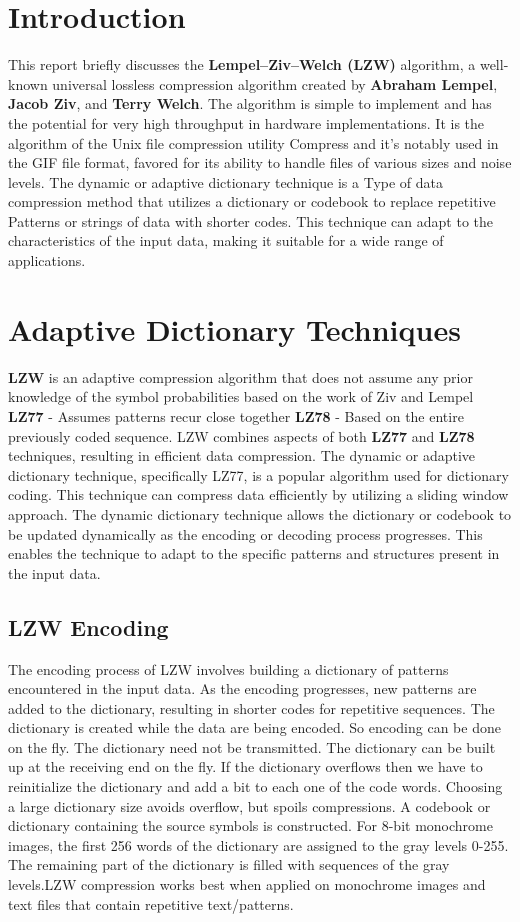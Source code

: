 \documentclass[12pt, a4paper]{article}
\begin{document}
\section{Introduction}
This report briefly discusses the \textbf{Lempel–Ziv–Welch (LZW)} algorithm, a well-known universal lossless compression algorithm created by \textbf{Abraham Lempel}, \textbf{Jacob Ziv}, and \textbf{Terry Welch}. The algorithm is simple to implement and has the potential for very high throughput in hardware implementations.\cite{welch1984technique}
 It is the algorithm of the Unix file compression utility Compress and it's notably used in the GIF file format, favored for its ability to handle files of various sizes and noise levels. The dynamic or adaptive dictionary technique is a Type of data compression method that utilizes a dictionary or codebook to replace repetitive Patterns or strings of data with shorter codes. This technique can adapt to the characteristics of the input data, making it suitable for a wide range of applications.
\section{Adaptive Dictionary Techniques}
\textbf{LZW} is an adaptive compression algorithm that does not assume any prior knowledge of the symbol probabilities based on the work of Ziv and Lempel \textbf{LZ77} - Assumes patterns recur close together \textbf{LZ78} - Based on the entire previously coded sequence.\cite{ziv1977universal} LZW combines aspects of both \textbf{LZ77} and \textbf{LZ78} techniques, resulting in efficient data compression. The dynamic or adaptive dictionary technique, specifically LZ77, is a popular algorithm used for dictionary coding. This technique can compress data efficiently by utilizing a sliding window approach. The dynamic dictionary technique allows the dictionary or codebook to be updated dynamically as the encoding or decoding process progresses. This enables the technique to adapt to the specific patterns and structures present in the input data.
\subsection{LZW Encoding}
The encoding process of LZW involves building a dictionary of patterns encountered in the input data. As the encoding progresses, new patterns are added to the dictionary, resulting in shorter codes for repetitive sequences.
The dictionary is created while the data are being encoded. So encoding can be done on the fly. The dictionary need not be transmitted. The dictionary can be built up at the receiving end on the fly. If the dictionary overflows then we have to reinitialize the dictionary and add a bit to each one of the code words. Choosing a large dictionary size avoids overflow, but spoils compressions. A codebook or dictionary containing the source symbols is constructed. For 8-bit monochrome images, the first 256 words of the dictionary are assigned to the gray levels 0-255. The remaining part of the dictionary is filled with sequences of the gray levels.LZW compression works best when applied on monochrome images and text files that contain repetitive text/patterns.
\end{document}
